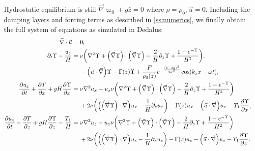 \documentclass[twocolumn,
        nofootinbib, %
        usenames, %
        aps,
        prd,
        dvipsnames %
    ]{revtex4-1}%
\newcommand*{\pd}[2]{\frac{\partial#1}{\partial#2}}
\DeclarePairedDelimiter\p{\lparen}{\rparen}
\begin{document}
Hydrostatic equilibrium is still $\vec{\nabla} \varpi_0 + g\hat{z} = 0$ where
$\rho = \rho_0, \vec{u} = 0$. Including the damping layers and forcing terms as
described in \autoref{ss:numerics}, we finally obtain the full system of
equations as simulated in Dedalus:
\begin{subequations}
    \begin{align}
        \vec{\nabla} \cdot \vec{u} ={}& 0,\\
        \partial_t \Upsilon - \frac{u_z}{H}
            ={}& \nu\p*{\nabla^2 \Upsilon + \p*{\vec{\nabla}
            \Upsilon} \cdot \p*{\vec{\nabla}\Upsilon} - \frac{2}{H}\partial_z
            \Upsilon + \frac{1 - e^{-\Upsilon}}{H^2}},\nonumber\\
            & - \p*{\vec{u} \cdot \vec{\nabla}}\Upsilon
                -\Gamma(z) \Upsilon
                + \frac{F}{\rho_0(z)}e^{-\frac{(z - z_0)^2}{2\sigma^2}}
                    \cos \p*{k_xx - \omega t},\\
        \pd{u_x}{t} + \pd{T}{x} + gH\pd{\Upsilon}{x} ={}&
            \nu \nabla^2 u_x
            - u_x \nu\p*{\nabla^2 \Upsilon + \p*{\vec{\nabla} \Upsilon} \cdot
                \p*{\vec{\nabla}\Upsilon} - \frac{2}{H}\partial_z \Upsilon
                + \frac{1 - e^{-\Upsilon}}{H^2}}\nonumber\\
            &+ 2\nu \p*{\p*{\p*{\vec{\nabla}\Upsilon} \cdot \vec{\nabla}}u_x
                - \frac{1}{H}\partial_z u_x}
            -\Gamma(z) u_x
                - \p*{\vec{u} \cdot \vec{\nabla}}u_x
                - T_1 \pd{\Upsilon}{x},\\
        \pd{u_z}{t} + \pd{T}{z} + gH\pd{\Upsilon}{z} - \frac{T_1}{H} ={}&
            \nu \nabla^2 u_z
            - u_z \nu\p*{\nabla^2 \Upsilon + \p*{\vec{\nabla} \Upsilon} \cdot
                \p*{\vec{\nabla}\Upsilon} - \frac{2}{H}\partial_z \Upsilon
                + \frac{1 - e^{-\Upsilon}}{H^2}}\nonumber\\
            &+ 2\nu \p*{\p*{\p*{\vec{\nabla}\Upsilon} \cdot \vec{\nabla}}u_z -
                \frac{1}{H}\partial_z u_{z}}
            -\Gamma(z) u_z - \p*{\vec{u} \cdot \vec{\nabla}}u_z
            - T_1 \pd{\Upsilon}{z}.
    \end{align}
\end{subequations}


\end{document}
